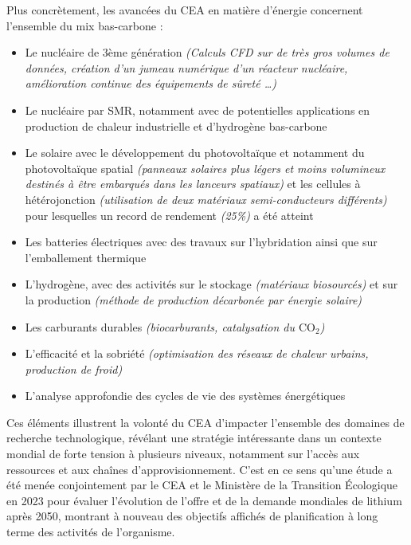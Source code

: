        Plus concrètement, les avancées du \gls{CEA} en matière d'énergie concernent l'ensemble du mix bas-carbone :
        \begin{itemize}
            \item Le nucléaire de 3ème génération \textit{(Calculs CFD sur de très gros volumes de données, création d'un jumeau numérique d'un réacteur nucléaire, amélioration continue des équipements de sûreté \ldots)}
            \item Le nucléaire par \gls{SMR}, notamment avec de potentielles applications en production de chaleur industrielle et d'hydrogène bas-carbone
            \item Le solaire avec le développement du photovoltaïque et notamment du photovoltaïque spatial \textit{(panneaux solaires plus légers et moins volumineux destinés à être embarqués dans les lanceurs spatiaux)} et les cellules à hétérojonction \textit{(utilisation de deux matériaux semi-conducteurs différents)} pour lesquelles un record de rendement \textit{(25\%)} a été atteint
            \item Les batteries électriques avec des travaux sur l'hybridation ainsi que sur l'emballement thermique
            \item L'hydrogène, avec des activités sur le stockage \textit{(matériaux biosourcés)} et sur la production \textit{(méthode de production décarbonée par énergie solaire)}
            \item Les carburants durables \textit{(biocarburants, catalysation du $\textrm {CO}_2$)}
            \item L'efficacité et la sobriété \textit{(optimisation des réseaux de chaleur urbains, production de froid)}
            \item L'analyse approfondie des cycles de vie des systèmes énergétiques
        \end{itemize}

    \begin{tcolorbox}[colback=linkborderColor!5!white,colframe=linkborderColor!75!black]
        Ces éléments illustrent la volonté du \gls{CEA} d'impacter l'ensemble des domaines de recherche technologique, révélant une stratégie intéressante dans un contexte mondial de forte tension à plusieurs niveaux, notamment sur l'accès aux ressources et aux chaînes d'approvisionnement.
        C'est en ce sens qu'une étude a été menée conjointement par le \gls{CEA} et le Ministère de la Transition Écologique en 2023 pour évaluer l'évolution de l'offre et de la demande mondiales de lithium après 2050, montrant à nouveau des objectifs affichés de planification à long terme des activités de l'organisme.
    \end{tcolorbox}


